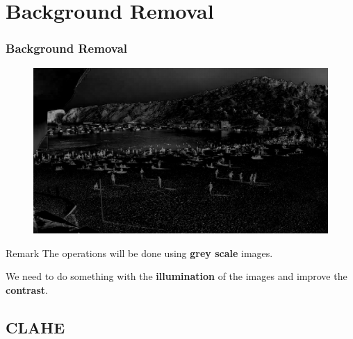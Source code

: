 \documentclass{beamer}
\begin{document}

\section{Background Removal}
    \begin{frame}
        \frametitle{Background Removal}
        \begin{figure}
            \centering
            \includegraphics[width=\textwidth]{../gen/sub/1660320000.jpg}
        \end{figure}
    \end{frame}

\begin{frame}

    \begin{block}{Remark}
        The operations will be done using \textbf{grey scale} images.
        \end{block}\medskip
        
        We need to do something with the \textbf{illumination} of the images and improve the \textbf{contrast}.
        
\end{frame}
\subsection*{CLAHE}
\end{document}
